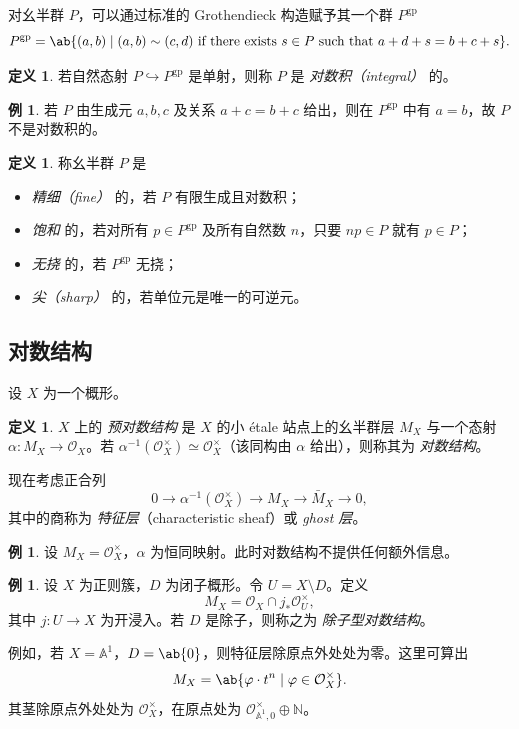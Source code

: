 \documentclass{amsart}
\theoremstyle{definition}
\newtheorem{defn}[thm]{定义}
\newtheorem{exm}[thm]{例}
\theoremstyle{remark}
\theoremstyle{plain}
\theoremstyle{definition}
\theoremstyle{remark}
\newcommand{\A}{\mathbb{A}}
\newcommand{\N}{\mathbb{N}}
\newcommand{\mc}[1]{\mathcal{#1}}
\newcommand{\mr}[1]{\mathrm{#1}}
\newcommand{\on}[1]{\operatorname{#1}}
\newcommand{\1}{\mathbf{1}}
\newcommand{\2}{\mathbf{2}}
\newcommand{\3}{\mathbf{3}}
\begin{document}
对幺半群 \(P\)，可以通过标准的 Grothendieck 构造赋予其一个群 \(P^{\mr{gp}}\)
\[ P^{\mr{gp}} = \ab\{(a,b) \mid (a,b) \sim (c,d) \text{ if there exists } s \in P \text{ such that } a+d+s = b+c+s \}. \]
\begin{defn}
若自然态射 \(P \hookrightarrow P^{\mr{gp}}\) 是单射，则称 \(P\) 是 \textit{对数积（integral）} 的。
\end{defn}

\begin{exm}
    若 \(P\) 由生成元 \(a,b,c\) 及关系 \(a+c=b+c\) 给出，则在 \(P^{\on{gp}}\) 中有 \(a = b\)，故 \(P\) 不是对数积的。
\end{exm}

\begin{defn}
    称幺半群 \(P\) 是
    \begin{itemize}
        \item \textit{精细（fine）} 的，若 \(P\) 有限生成且对数积；
        \item \textit{饱和} 的，若对所有 \(p \in P^{\mr{gp}}\) 及所有自然数 \(n\)，只要 \(np \in P\) 就有 \(p \in P\)；
        \item \textit{无挠} 的，若 \(P^{\mr{gp}}\) 无挠；
        \item \textit{尖（sharp）} 的，若单位元是唯一的可逆元。
    \end{itemize}
\end{defn}

\subsection{对数结构}%
\label{sub:Log structures}

设 \(X\) 为一个概形。
\begin{defn}
    \(X\) 上的 \textit{预对数结构} 是 \(X\) 的小 \'etale 站点上的幺半群层 \(M_X\) 与一个态射 \(\alpha \colon M_X \to \mc{O}_X\)。若 \(\alpha^{-1}(\mc{O}_X^{\times}) \simeq \mc{O}_X^{\times}\)（该同构由 \(\alpha\) 给出），则称其为 \textit{对数结构}。 
\end{defn}

现在考虑正合列
\[ 0 \to \alpha^{-1}(\mc{O}_X^{\times}) \to M_X \to \bar{M}_X \to 0, \]
其中的商称为 \textit{特征层}（characteristic sheaf）或 \textit{ghost 层}。

\begin{exm}
    设 \(M_X = \mc{O}_X^{\times}\)，\(\alpha\) 为恒同映射。此时对数结构不提供任何额外信息。
\end{exm}

\begin{exm}
    设 \(X\) 为正则簇，\(D\) 为闭子概形。令 \(U = X \setminus D\)。定义
    \[ M_X = \mc{O}_X \cap j_* \mc{O}_U^{\times}, \]
    其中 \(j \colon U \to X\) 为开浸入。若 \(D\) 是除子，则称之为 \textit{除子型对数结构}。

    例如，若 \(X = \A^1\)，\(D = \ab\{0\}\)，则特征层除原点外处处为零。这里可算出
    \[ M_X = \ab\{ \varphi \cdot t^n \mid \varphi \in \mc{O}_X^{\times} \}. \]
    其茎除原点外处处为 \(\mc{O}_X^{\times}\)，在原点处为 \(\mc{O}_{\A^1, 0}^{\times} \oplus \N\)。
\end{exm}
\end{document}
